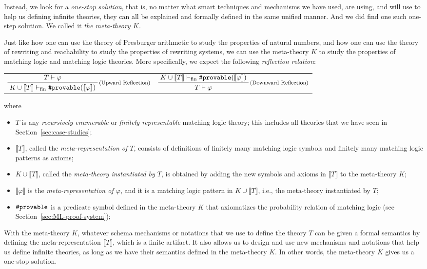 \documentclass[UTF8,11pt]{article}
\theoremstyle{plain}
\theoremstyle{definition}
\theoremstyle{remark}
\newcommand{\vdashfin}{\vdash_\text{fin}}
\newcommand{\denote}[1]{\llbracket{#1}\rrbracket}
\newcommand{\sharpsymbol}{\#}
\newcommand{\Kdeduce}{\textup{\texttt{\sharpsymbol provable}}}
\begin{document}
Instead, we look for a \emph{one-stop solution}, that is, no matter what smart 
techniques and mechanisms we have used, are using, and will use to help us 
defining infinite theories, they 
can all be explained and formally defined in the same unified manner.
And we did find one such one-step solution. We called it \emph{the meta-theory 
$K$.}

Just like how one can use the theory of Presburger arithmetic to study the 
properties of natural numbers, and how one can use the theory of rewriting and 
reachability to study the properties of rewriting systems, we can use the 
meta-theory $K$ to study the properties of matching logic and matching logic 
theories.
More specifically, we expect the following \emph{reflection relation}:
\begin{center}
	\begin{tabular}{cc}
		$
		\prftree[r]{\footnotesize (Upward Reflection)}
		{T \vdash \varphi}
		{K \cup \denote{T} \vdashfin \Kdeduce(\denote{\varphi})}
		$
		&
		$
		\prftree[r]{\footnotesize (Downward Reflection)}
		{K \cup \denote{T} \vdashfin \Kdeduce(\denote{\varphi})}
		{T \vdash \varphi}
		$
	\end{tabular}
\end{center}
where 
\begin{itemize}
	\item $T$ is any \emph{recursively enumerable} or \emph{finitely 
	representable} matching logic theory; this includes all theories that we 
	have seen in Section~\ref{sec:case-studies};
	\item $\denote{T}$, called the \emph{meta-representation of $T$}, consists 
	of definitions of finitely many matching logic symbols and finitely many 
	matching logic patterns as axioms;
	\item $K \cup \denote{T}$, called the \emph{meta-theory instantiated by 
	$T$}, is obtained by adding the new symbols and axioms in 
	$\denote{T}$ to the meta-theory $K$;
	\item $\denote{\varphi}$ is the \emph{meta-representation of $\varphi$}, 
	and it is a matching logic pattern in $K \cup \denote{T}$, i.e., the 
	meta-theory instantiated by $T$;
	\item $\Kdeduce$ is a predicate symbol defined in the meta-theory $K$ that 
	axiomatizes the probability relation of matching logic (see 
	Section~\ref{sec:ML-proof-system});
\end{itemize}

With the meta-theory $K$, whatever schema mechanisms or notations that we use 
to define the theory $T$ can be given a formal semantics by 
defining the meta-representation $\denote{T}$, which is a finite artifact.
It also allows us to design and use new mechanisms and notations that help us 
define infinite theories, as long as we have their semantics defined in the 
meta-theory $K$.
In other words, the meta-theory $K$ gives us a one-stop solution.
\end{document}
